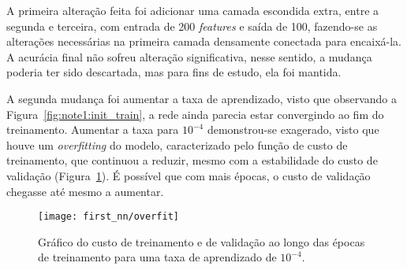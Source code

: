 A primeira alteração feita foi adicionar uma camada escondida extra, entre a segunda e terceira, com entrada de 200 \textit{features} e saída de 100, fazendo-se as alterações necessárias na primeira camada densamente conectada para encaixá-la. A acurácia final não sofreu alteração significativa, nesse sentido, a mudança poderia ter sido descartada, mas para fins de estudo, ela foi mantida.

A segunda mudança foi aumentar a taxa de aprendizado, visto que observando a Figura~\ref{fig:note1:init_train}, a rede ainda parecia estar convergindo ao fim do treinamento. Aumentar a taxa para $10^{-4}$ demonstrou-se exagerado, visto que houve um \textit{overfitting} do modelo, caracterizado pelo função de custo de treinamento, que continuou a reduzir, mesmo com a estabilidade do custo de validação (Figura~\ref{fig:note1:overfit}). É possível que com mais épocas, o custo de validação chegasse até mesmo a aumentar.

\begin{figure}[!htb]
	\centering
	\texttt{[image: first\_nn/overfit]}
	\caption{Gráfico do custo de treinamento e de validação ao longo das épocas de treinamento para uma taxa de aprendizado de $10^{-4}$.}
	\label{fig:note1:overfit}
\end{figure}
